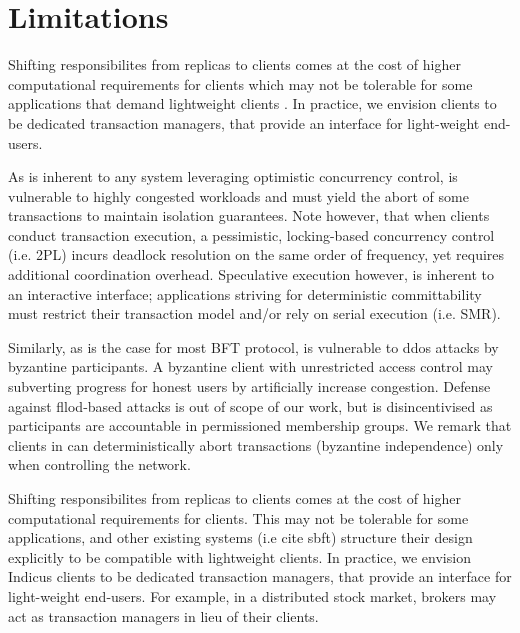 \section{Limitations}
Shifting responsibilites from replicas to clients comes at the cost of higher computational requirements for clients which may not be tolerable for some applications that demand lightweight clients \cite{gueta2018sbft}. In practice, we envision \sys clients to be dedicated transaction managers, that provide an interface for light-weight end-users. 

As is inherent to any system leveraging optimistic concurrency control, \sys is vulnerable to highly congested workloads and must yield the abort of some transactions to maintain isolation guarantees. Note however, that when clients conduct transaction execution, a pessimistic, locking-based concurrency control (i.e. 2PL) incurs deadlock resolution on the same order of frequency, yet requires additional coordination overhead. Speculative execution however, is inherent to an interactive interface; applications striving for deterministic committability must restrict their transaction model and/or rely on serial execution (i.e. SMR). 

Similarly, as is the case for most BFT protocol, \sys is vulnerable to ddos attacks by byzantine participants. A byzantine client with unrestricted access control may subverting progress for honest users by artificially increase congestion. Defense against fllod-based attacks is out of scope of our work, but is disincentivised as participants are accountable in permissioned membership groups. We remark that clients in \sys can deterministically abort transactions (byzantine independence) only when controlling the network.



\iffalse

Shifting responsibilites from replicas to clients comes at the cost of higher computational requirements for clients. This may not be tolerable for some applications, and other existing systems (i.e cite sbft) structure their design explicitly to be compatible with lightweight clients. In practice, we envision Indicus clients to be dedicated transaction managers, that provide an interface for light-weight end-users. For example, in a distributed stock market, brokers may act as transaction managers in lieu of their clients.

